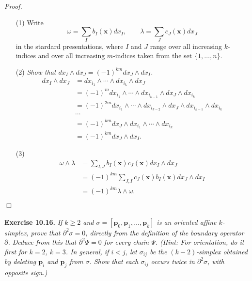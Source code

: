 \documentclass{article}
\begin{document}
\emph{Proof.}
\begin{enumerate}
\item[(1)]
  Write
  \[
    \omega = \sum_I b_I(\mathbf{x}) dx_I,
    \qquad
    \lambda = \sum_J c_J(\mathbf{x}) dx_J
  \]
  in the stardard presentations,
  where $I$ and $J$ range over all increasing $k$-indices
  and over all increasing $m$-indices taken from the set $\{1,\ldots,n\}$.

\item[(2)]
  \emph{Show that $dx_I \wedge dx_J = (-1)^{km} dx_J \wedge dx_I$.}
  \begin{align*}
    dx_I \wedge dx_J
    &= dx_{i_1} \wedge \cdots \wedge dx_{i_k}
      \wedge dx_J \\
    &= (-1)^m dx_{i_1} \wedge \cdots \wedge dx_{i_{k-1}}
      \wedge dx_J \wedge dx_{i_{k}} \\
    &= (-1)^{2m} dx_{i_1} \wedge \cdots \wedge dx_{i_{k-2}}
      \wedge dx_J \wedge dx_{i_{k-1}} \wedge dx_{i_{k}} \\
    &\cdots \\
    &= (-1)^{km} dx_J
      \wedge dx_{i_1} \wedge \cdots \wedge dx_{i_k} \\
    &= (-1)^{km} dx_J \wedge dx_I.
  \end{align*}

\item[(3)]
  \begin{align*}
    \omega \wedge \lambda
    &= \sum_{I,J} b_I(\mathbf{x}) c_J(\mathbf{x}) dx_I \wedge dx_J \\
    &= (-1)^{km} \sum_{J,I} c_J(\mathbf{x}) b_I(\mathbf{x}) dx_J \wedge dx_I \\
    &= (-1)^{km} \lambda \wedge \omega.
  \end{align*}
\end{enumerate}
$\Box$ \\\\






\textbf{Exercise 10.16.}
\emph{If $k \geq 2$ and $\sigma = [\mathbf{p}_0,\mathbf{p}_1,\ldots,\mathbf{p}_k]$
is an oriented affine $k$-simplex, prove that $\partial^2 \sigma = 0$,
directly from the definition of the boundary operator $\partial$.
Deduce from this that $\partial^2 \Psi = 0$ for every chain $\Psi$.
(Hint: For orientation, do it first for $k=2$, $k=3$.
In general, if $i < j$, let $\sigma_{ij}$ be the $(k-2)$-simplex obtained by
deleting $\mathbf{p}_i$ and $\mathbf{p}_j$ from $\sigma$.
Show that each $\sigma_{ij}$ occurs twice in $\partial^2\sigma$, with opposite sign.)} \\
\end{document}
